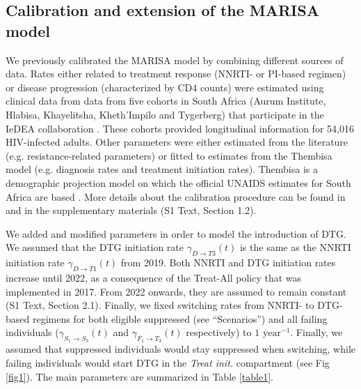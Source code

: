 \documentclass[10pt,letterpaper]{article}
\begin{document}
\subsection*{Calibration and extension of the MARISA model}
We previously calibrated the MARISA model by combining different sources of data. Rates either related to treatment response (NNRTI- or PI-based regimen) or disease progression (characterized by CD4 counts) were estimated using clinical data from data from five cohorts in South Africa (Aurum Institute, Hlabisa, Khayelitsha, Kheth’Impilo and Tygerberg) that participate in the IeDEA collaboration  \cite{Egger2012}. These cohorts provided longitudinal information for 54,016 HIV-infected adults. Other parameters were either estimated from the literature (e.g. resistance-related parameters) or fitted to estimates from the Thembisa model (e.g. diagnosis rates and treatment initiation rates). Thembisa is a demographic projection model on which the official UNAIDS estimates for South Africa are based \cite{Johnson2017b}. More details about the calibration procedure can be found in \cite{Hauser2019} and in the supplementary materials (S1 Text, Section 1.2).

We added and modified parameters in order to model the introduction of DTG. We assumed that the DTG initiation rate $\gamma_{D\rightarrow T3}^{}(t)$ is the same as the NNRTI initiation rate $\gamma_{D\rightarrow T1}^{}(t)$ from 2019. Both NNRTI and DTG initiation rates increase until 2022, as a consequence of the Treat-All policy that was implemented in 2017. From 2022 onwards, they are assumed to remain constant (S1 Text, Section 2.1). Finally, we fixed switching rates from NNRTI- to DTG-based regimens for both eligible suppressed (see “Scenarios”) and all failing individuals ($\gamma_{S_1\rightarrow S_3}^{}(t)$ and $\gamma_{F_1\rightarrow T_3}^{}(t)$ respectively) to $1\text{ year}^{-1}$. Finally, we assumed that suppressed individuals would stay suppressed when switching, while failing individuals would start DTG in the \textit{Treat init.} compartment (see Fig \ref{fig1}). The main parameters are summarized in Table \ref{table1}.

\newcolumntype{b}{X}
\newcommand{\heading}[1]{\multicolumn{1}{c}{#1}}
\newcommand\Tstrut{\rule{0pt}{2.8ex}}         %
\newcommand\Bstrut{\rule[-1ex]{0pt}{0pt}}
\end{document}
